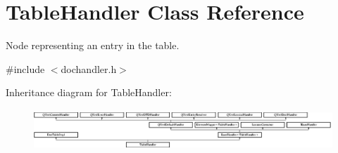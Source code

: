 \hypertarget{class_table_handler}{}\section{Table\+Handler Class Reference}
\label{class_table_handler}


Node representing an entry in the table.  




{\ttfamily \#include $<$dochandler.\+h$>$}

Inheritance diagram for Table\+Handler\+:\begin{figure}[H]
\begin{center}
\leavevmode
\includegraphics[height=1.538461cm]{class_table_handler}
\end{center}
\end{figure}

